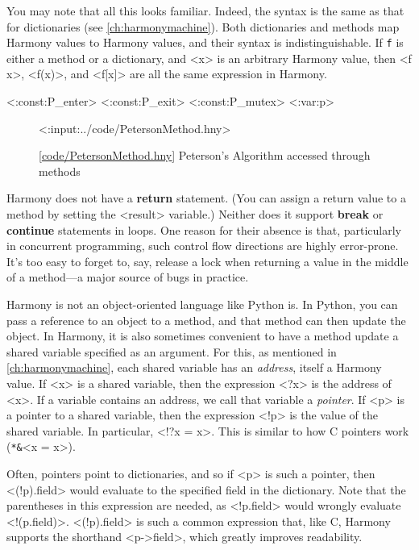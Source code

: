 \documentclass{report}
\newcommand{\harmonylink}[1]{%
[\href{https://harmony.cs.cornell.edu/#1}{\underline{#1}}]%
}
\newenvironment{code}{
\tcolorbox
}{
\endtcolorbox
}
\begin{document}
You may note that all this looks familiar.  Indeed, the syntax
is the same as that for dictionaries (see \autoref{ch:harmonymachine}).
Both dictionaries and methods map Harmony values to Harmony values,
and their syntax is indistinguishable.
If \texttt{f} is either a method or a
dictionary, and <{x}> is an arbitrary Harmony value, then
<{f x}>, <{f(x)}>, and <{f[x]}> are all
the same expression in Harmony.

<{:const:P_enter}>
<{:const:P_exit}>
<{:const:P_mutex}>
<{:var:p}>

\begin{figure}
\begin{code}
<{:input:../code/PetersonMethod.hny}>
\end{code}
\caption{\harmonylink{code/PetersonMethod.hny} Peterson's Algorithm accessed through methods}
\label{fig:petersonmethods}
\end{figure}

Harmony does not have a \textbf{return} statement.  (You can assign a return value
to a method by setting the <{result}> variable.)  Neither does it support
\textbf{break} or \textbf{continue} statements in loops.  One reason for their absence is
that, particularly in concurrent programming, such control flow directions are highly
error-prone.  It's too easy to forget to, say, release a lock when returning a value in the
middle of a method---a major source of bugs in practice.

Harmony is not an object-oriented language like Python is.  In Python,
you can pass a reference to an object to a method, and that method
can then update the object.  In Harmony, it is also sometimes convenient
to have a method update a shared variable specified as an argument.
For this, as mentioned in \autoref{ch:harmonymachine},
each shared variable has an \emph{address}, itself a Harmony value.
%
If <{x}> is a shared variable, then the expression <{?x}> is the address of <{x}>.
If a variable contains an address, we call that variable a \emph{pointer}.
%
If <{p}> is a pointer to a shared variable, then the
expression <{!p}> is the value of the shared variable.
In particular, <{!?x = x}>.
This is similar to how C pointers work (\texttt{*\string&}<{x = x}>).

Often, pointers point to dictionaries, and so if <{p}> is such a pointer,
then <{(!p).field}> would evaluate to the specified field in the dictionary.
Note that the parentheses in this expression
are needed, as <{!p.field}> would wrongly evaluate
<{!(p.field)}>.
<{(!p).field}> is such a common expression that, like C, Harmony supports the
shorthand <{p->field}>, which greatly improves readability.
\end{document}
